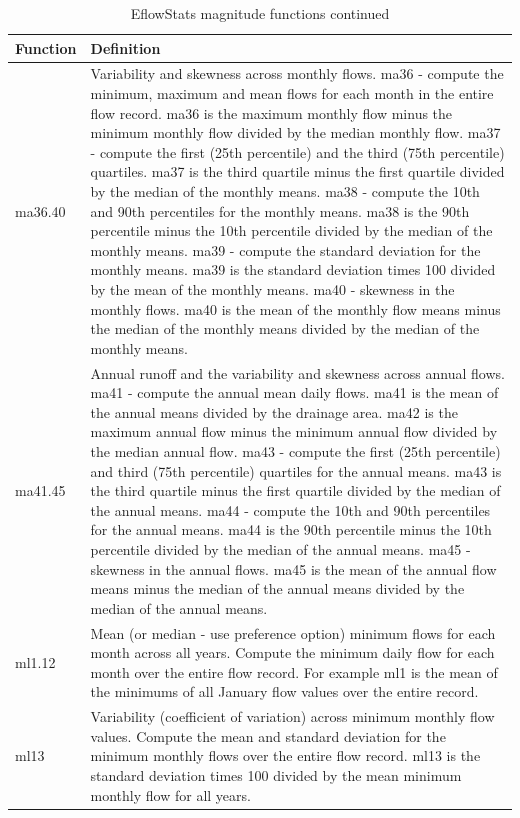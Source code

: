 \documentclass[a4paper,11pt]{article}\usepackage[]{graphicx}\usepackage[]{color}
\begin{document}
\begin{table}[ht]
  \centering
  \begin{threeparttable}[b]
  \caption{EflowStats magnitude functions continued}
  \label{tab:mag2Stats}
  \begin{tabularx}{\textwidth}{|l|X|}
  \hline
\textbf{Function} & \textbf{Definition} \\ 
  \hline
  ma36.40 & Variability and skewness across monthly flows. ma36 - compute the minimum, maximum and mean flows for each month in the entire flow record. ma36 is the maximum monthly flow minus the minimum monthly flow divided by the median monthly flow. ma37 - compute the first (25th percentile) and the third (75th percentile) quartiles. ma37 is the third quartile minus the first quartile divided by the median of the monthly means. ma38 - compute the 10th and 90th percentiles for the monthly means. ma38 is the 90th percentile minus the 10th percentile divided by the median of the monthly means. ma39 - compute the standard deviation for the monthly means. ma39 is the standard deviation times 100 divided by the mean of the monthly means. ma40 - skewness in the monthly flows. ma40 is the mean of the monthly flow means minus the median of the monthly means divided by the median of the monthly means. \\
  ma41.45 & Annual runoff and the variability and skewness across annual flows. ma41 - compute the annual mean daily flows. ma41 is the mean of the annual means divided by the drainage area. ma42 is the maximum annual flow minus the minimum annual flow divided by the median annual flow. ma43 - compute the first (25th percentile) and third (75th percentile) quartiles for the annual means. ma43 is the third quartile minus the first quartile divided by the median of the annual means. ma44 - compute the 10th and 90th percentiles for the annual means. ma44 is the 90th percentile minus the 10th percentile divided by the median of the annual means. ma45 - skewness in the annual flows. ma45 is the mean of the annual flow means minus the median of the annual means divided by the median of the annual means. \\
  ml1.12 & Mean (or median - use preference option) minimum flows for each month across all years. Compute the minimum daily flow for each month over the entire flow record. For example ml1 is the mean of the minimums of all January flow values over the entire record. \\
  ml13 & Variability (coefficient of variation) across minimum monthly flow values. Compute the mean and standard deviation for the minimum monthly flows over the entire flow record. ml13 is the standard deviation times 100 divided by the mean minimum monthly flow for all years. \\

\end{tabularx}
\end{threeparttable}
\end{table}
\end{document}
